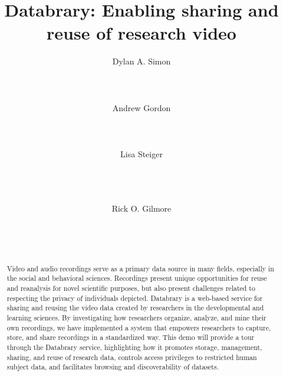 \documentclass{sig-alternate-2013}
\begin{document}

\title{Databrary: Enabling sharing and reuse of research video}


\author{
\alignauthor
Dylan A. Simon\\
	\\
	\\
	\\
\alignauthor
Andrew Gordon\\
	\\
	\\
	\\
\alignauthor
Lisa Steiger\\
	\\
	\\
	\\
\and
Rick O. Gilmore\\
	\\
	\\
	\\
}

\maketitle

\begin{abstract}
Video and audio recordings serve as a primary data source in many fields, especially in the social and behavioral sciences.
Recordings present unique opportunities for reuse and reanalysis for novel scientific purposes, but also present challenges related to respecting the privacy of individuals depicted.
Databrary is a web-based service for sharing and reusing the video data created by researchers in the developmental and learning sciences.
By investigating how researchers organize, analyze, and mine their own recordings, we have implemented a system that empowers researchers to capture, store, and share recordings in a standardized way.
This demo will provide a tour through the Databrary service, highlighting how it promotes storage, management, sharing, and reuse of research data, controls access privileges to restricted human subject data, and facilitates browsing and discoverability of datasets.
\end{abstract}
\end{document}
